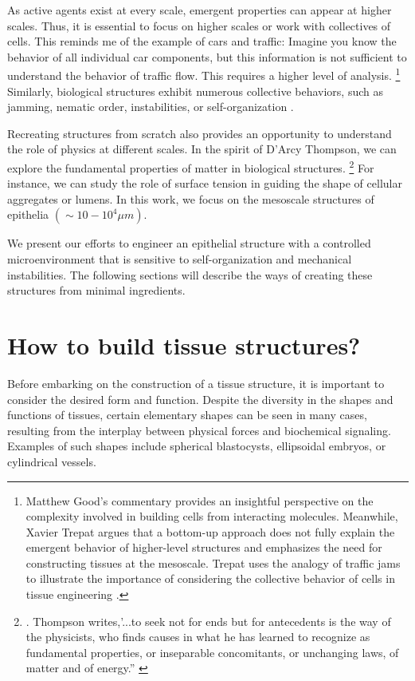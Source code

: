 As active agents exist at every scale, emergent properties can appear at higher scales. Thus, it is essential to focus on higher scales or work with collectives of cells. This reminds me of the example of cars and traffic: Imagine you know the behavior of all individual car components, but this information is not sufficient to understand the behavior of traffic flow. This requires a higher level of analysis. 
\footnote{Matthew Good's commentary provides an insightful perspective on the complexity involved in building cells from interacting molecules. Meanwhile, Xavier Trepat argues that a bottom-up approach does not fully explain the emergent behavior of higher-level structures and emphasizes the need for constructing tissues at the mesoscale. Trepat uses the analogy of traffic jams to illustrate the importance of considering the collective behavior of cells in tissue engineering \cite{good2018}.} 
Similarly, biological structures exhibit numerous collective behaviors, such as jamming, nematic order, instabilities, or self-organization \cite{trepat2018}. 

Recreating structures from scratch also provides an opportunity to understand the role of physics at different scales. In the spirit of D'Arcy Thompson, we can explore the fundamental properties of matter in biological structures.
\footnote{. Thompson writes,’...to seek not for ends but for antecedents is the way of the physicists, who finds causes in what he has learned to recognize as fundamental properties, or inseparable concomitants, or unchanging laws, of matter and of energy.” \cite{thompson1979}}
For instance, we can study the role of surface tension in guiding the shape of cellular aggregates or lumens. In this work, we focus on the mesoscale structures of epithelia \((\sim 10-10^4 \mu m)\).  

We present our efforts to engineer an epithelial structure with a controlled microenvironment that is sensitive to self-organization and mechanical instabilities. The following sections will describe the ways of creating these structures from minimal ingredients.

\hypertarget{how-to-build-tissue-structures}{%
	\section{How to build tissue 		structures?}\label{how-to-build-tissue-structures}}

Before embarking on the construction of a tissue structure, it is important to consider the desired form and function. Despite the diversity in the shapes and functions of tissues, certain elementary shapes can be seen in many cases, resulting from the interplay between physical forces and biochemical signaling. Examples of such shapes include spherical blastocysts, ellipsoidal embryos, or cylindrical vessels.

